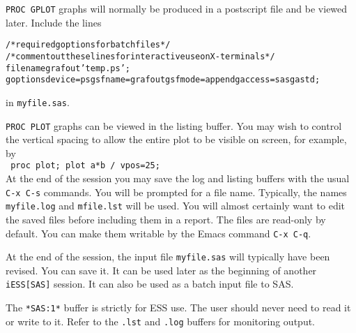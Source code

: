 \documentclass{article}
\newcommand{\stexttt}[1]{{\small\texttt{#1}}}
\newcommand{\elcode}[1]{\\{\stexttt{\hspace*{2em} #1}}\\}
\newenvironment{Salltt}{\small\begin{alltt}}{\end{alltt}}
\begin{document}
\stexttt{PROC GPLOT} graphs will normally be produced in a postscript
file and be viewed later.  Include the lines
\begin{Salltt}
    /* required goptions for batch files */
    /* comment out these lines for interactive use on X-terminals*/
    filename grafout 'temp.ps';
    goptions device=ps gsfname=grafout gsfmode=append gaccess=sasgastd;
\end{Salltt}
\noindent
in \stexttt{myfile.sas}.

\stexttt{PROC PLOT} graphs can be viewed in the listing buffer.  You
may wish to control the vertical spacing to allow the entire plot to
be visible on screen, for example, by
\elcode{proc plot; plot a*b / vpos=25;}
 
At the end of the session you may save the log and listing buffers
with the usual \stexttt{C-x C-s} commands.  You will be prompted for a
file name.  Typically, the names \stexttt{myfile.log} and
\stexttt{mfile.lst} will be used.  You will almost certainly want to
edit the saved files before including them in a report.  The files are
read-only by default.  You can make them writable by the Emacs command
\stexttt{C-x C-q}.
 
At the end of the session, the input file \stexttt{myfile.sas} will
typically have been revised.  You can save it.  It can be used later
as the beginning of another \stexttt{iESS[SAS]} session.  It can also
be used as a batch input file to SAS.
 
The \stexttt{*SAS:1*} buffer is strictly for ESS use.  The user should
never need to read it or write to it.  Refer to the \stexttt{.lst} and
\stexttt{.log} buffers for monitoring output.

\end{document}

